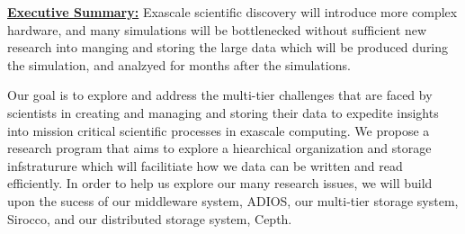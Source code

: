\documentclass[11pt,letterpaper]{article}
\begin{document}

% 









%

\underline{\textbf{Executive Summary:}} Exascale scientific discovery will
introduce more complex hardware, and many simulations will be bottlenecked 
without sufficient new research into manging and storing the large data which will be
produced during the simulation, and analzyed for months after the simulations.

Our goal is to explore and address
the multi-tier challenges that are faced by scientists in creating and
managing and storing their data  to expedite insights into
mission critical scientific processes in exascale computing.
%
We propose a research program that aims to explore a hiearchical organization and storage infstraturure which will facilitiate 
how we data can be written and read efficiently. In order to help us explore our many research issues, we will build upon the
sucess of our middleware system, ADIOS, our multi-tier storage system, Sirocco, and our distributed storage system, Cepth.
\end{document}
